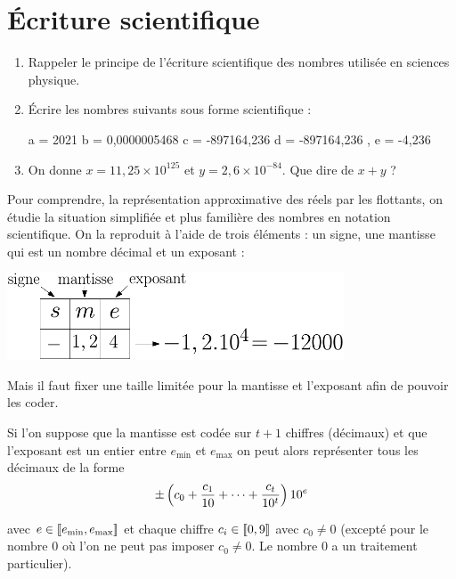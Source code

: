 \section{\'Ecriture scientifique}

\exercice{}

\begin{enumerate}[1.]
  \item Rappeler le principe de l'écriture scientifique des nombres utilisée en sciences physique.
  \item \'Ecrire les nombres suivants sous forme scientifique : 
  
  \begin{center}
a = 2021\hskip 0.5cm b = 0,0000005468 \hskip 0.5cm c = -897164,236  \hskip 0.5cm d = -897164,236 , \hskip 0.5cm e = -4,236 
\end{center}
  \item On donne $x = 11,25 \times 10^{125}$ et $y = 2,6\times 10^{-84}$. Que dire de $x+y$ ?
\end{enumerate}

Pour comprendre, la représentation approximative des réels par les flottants, on étudie la situation simplifiée et plus familière des nombres en notation scientifique. On la reproduit à l'aide de trois éléments : un signe, une mantisse qui est un nombre décimal et un exposant : 

\begin{center}
\includegraphics[width=10cm]{repr-nbs-2.pdf}
\end{center}

Mais il faut fixer une taille limitée pour la mantisse et l'exposant afin de pouvoir les coder.
\medskip

Si l'on suppose que la mantisse est codée sur $t+1$ chiffres (décimaux) et que l'exposant est un entier entre $e_{\min}$ et $e_{\max}$ on peut alors représenter tous les décimaux de la forme 
$$ \pm \left( c_0 + \frac{c_1}{10} + \dots + \frac{c_t}{10^t} \right) 10^e$$

avec $e \in [\![ e_{\min} , e_{\max} ]\!]$ et chaque chiffre $c_i \in [\![ 0 , 9 ]\!]$ avec $c_0 \neq 0$ (excepté pour le nombre $0$ où l'on ne peut pas imposer $c_0 \neq 0$. Le nombre $0$ a un traitement particulier). 

